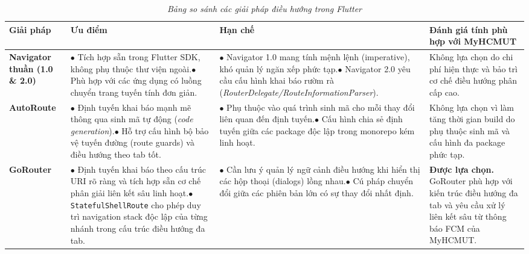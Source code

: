 \begin{table}[H]
    \centering
    \small
    \renewcommand{\arraystretch}{1.25}
    \begin{tabularx}{\textwidth}{|L{2.5cm}|Y|Y|L{3.3cm}|}
    \hline
    \textbf{Giải pháp} & \textbf{Ưu điểm} & \textbf{Hạn chế} & \textbf{Đánh giá tính phù hợp với MyHCMUT} \\
    \hline
    \textbf{Navigator thuần (1.0 \& 2.0)} & $\bullet$ Tích hợp sẵn trong Flutter SDK, không phụ thuộc thư viện ngoài.\newline $\bullet$ Phù hợp với các ứng dụng có luồng chuyển trang tuyến tính đơn giản. & $\bullet$ Navigator 1.0 mang tính mệnh lệnh (imperative), khó quản lý ngăn xếp phức tạp.\newline $\bullet$ Navigator 2.0 yêu cầu cấu hình khai báo rườm rà (\textit{RouterDelegate/RouteInformationParser}). & Không lựa chọn do chi phí hiện thực và bảo trì cơ chế điều hướng phân cấp cao. \\
    \hline
    \textbf{AutoRoute} & $\bullet$ Định tuyến khai báo mạnh mẽ thông qua sinh mã tự động (\textit{code generation}).\newline $\bullet$ Hỗ trợ cấu hình bộ bảo vệ tuyến đường (route guards) và điều hướng theo tab tốt. & $\bullet$ Phụ thuộc vào quá trình sinh mã cho mỗi thay đổi liên quan đến định tuyến.\newline $\bullet$ Cấu hình chia sẻ định tuyến giữa các package độc lập trong monorepo kém linh hoạt. & Không lựa chọn vì làm tăng thời gian build do phụ thuộc sinh mã và cấu hình đa package phức tạp. \\
    \hline
    \textbf{GoRouter} & $\bullet$ Định tuyến khai báo theo cấu trúc URI rõ ràng và tích hợp sẵn cơ chế phân giải liên kết sâu linh hoạt.\newline $\bullet$ \texttt{StatefulShellRoute} cho phép duy trì navigation stack độc lập của từng nhánh trong cấu trúc điều hướng đa tab. & $\bullet$ Cần lưu ý quản lý ngữ cảnh điều hướng khi hiển thị các hộp thoại (dialogs) lồng nhau.\newline $\bullet$ Cú pháp chuyển đổi giữa các phiên bản lớn có sự thay đổi nhất định. & \textbf{Được lựa chọn.} GoRouter \cite{gorouter_doc} phù hợp với kiến trúc điều hướng đa tab và yêu cầu xử lý liên kết sâu từ thông báo FCM của MyHCMUT. \\
    \hline
    \end{tabularx}
    \caption{\textit{Bảng so sánh các giải pháp điều hướng trong Flutter}}
    \label{tab:compare_routing}
\end{table}


